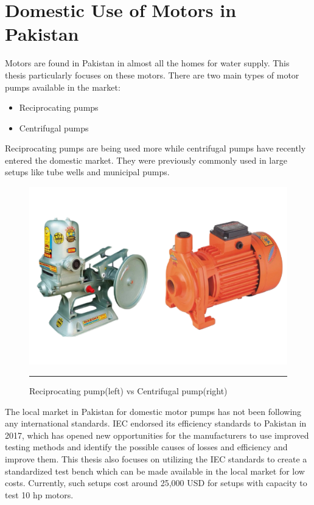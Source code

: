 \section{Domestic Use of Motors in Pakistan}
Motors are found in Pakistan in almost all the homes for water supply. This thesis particularly focuses on these motors. There are two main types of motor pumps available in the market:
\begin{itemize}
	\item Reciprocating pumps
	\item Centrifugal pumps
\end{itemize}
Reciprocating pumps are being used more while centrifugal pumps have recently entered the domestic market. They were previously commonly used in large setups like tube wells and municipal pumps.
\begin{figure}[htbp]
  \centering
    \includegraphics[width = 5in]{./Figures/MS/fig13.png}
    \rule{35em}{1.2pt}
  \caption{Reciprocating pump(left) vs Centrifugal pump(right)}
  \label{fig:Reciprocating pump(left) vs Centrifugal pump(right)}
\end{figure}
The local market in Pakistan for domestic motor pumps has not been following any international standards. IEC endorsed its efficiency standards to Pakistan in 2017, which has opened new opportunities for the manufacturers to use improved testing methods and identify the possible causes of losses and efficiency and improve them. This thesis also focuses on utilizing the IEC standards to create a standardized test bench which can be made available in the local market for low costs. Currently, such setups cost around 25,000 USD for setups with capacity to test 10 hp motors. 

